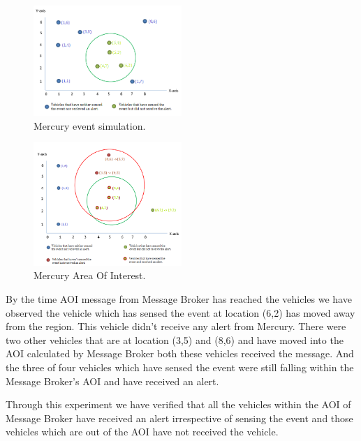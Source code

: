 \begin{figure}[ht]
  \begin{center}
    \includegraphics[width=0.5\textwidth]{figs/simulated.png}
    \caption{Mercury event simulation.}
    \label{fig:simulated}
  \end{center}
\end{figure}

\begin{figure}[ht]
  \begin{center}
    \includegraphics[width=0.5\textwidth]{figs/aoi.png}
    \caption{Mercury Area Of Interest.}
    \label{fig:aoi}
  \end{center}
\end{figure}

By the time AOI message from Message Broker has reached the vehicles
we have observed the vehicle which has sensed the event at location
(6,2) has moved away from the region. This vehicle didn’t receive any
alert from Mercury.  There were two other vehicles that are at
location (3,5) and (8,6) and have moved into the AOI calculated by
Message Broker both these vehicles received the message. And the three
of four vehicles which have sensed the event were still falling within
the Message Broker’s AOI and have received an alert.
   
Through this experiment we have verified that all the vehicles within the
AOI of Message Broker have received an alert irrespective of sensing
the event and those vehicles which are out of the AOI have not
received the vehicle.

